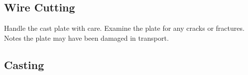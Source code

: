 \subsection{Wire Cutting}
Handle the cast plate with care. 
Examine the plate for any cracks or fractures. Notes the plate may have been damaged in transport. 

\subsection{Casting}